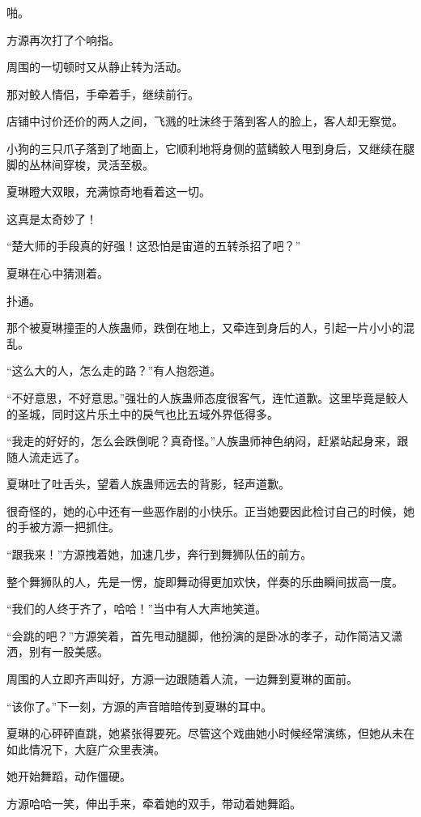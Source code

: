 
\begin{this_body}

啪。

方源再次打了个响指。

周围的一切顿时又从静止转为活动。

那对鲛人情侣，手牵着手，继续前行。

店铺中讨价还价的两人之间，飞溅的吐沫终于落到客人的脸上，客人却无察觉。

小狗的三只爪子落到了地面上，它顺利地将身侧的蓝鳞鲛人甩到身后，又继续在腿脚的丛林间穿梭，灵活至极。

夏琳瞪大双眼，充满惊奇地看着这一切。

这真是太奇妙了！

“楚大师的手段真的好强！这恐怕是宙道的五转杀招了吧？”

夏琳在心中猜测着。

扑通。

那个被夏琳撞歪的人族蛊师，跌倒在地上，又牵连到身后的人，引起一片小小的混乱。

“这么大的人，怎么走的路？”有人抱怨道。

“不好意思，不好意思。”强壮的人族蛊师态度很客气，连忙道歉。这里毕竟是鲛人的圣城，同时这片乐土中的戾气也比五域外界低得多。

“我走的好好的，怎么会跌倒呢？真奇怪。”人族蛊师神色纳闷，赶紧站起身来，跟随人流走远了。

夏琳吐了吐舌头，望着人族蛊师远去的背影，轻声道歉。

很奇怪的，她的心中还有一些恶作剧的小快乐。正当她要因此检讨自己的时候，她的手被方源一把抓住。

“跟我来！”方源拽着她，加速几步，奔行到舞狮队伍的前方。

整个舞狮队的人，先是一愣，旋即舞动得更加欢快，伴奏的乐曲瞬间拔高一度。

“我们的人终于齐了，哈哈！”当中有人大声地笑道。

“会跳的吧？”方源笑着，首先甩动腿脚，他扮演的是卧冰的孝子，动作简洁又潇洒，别有一股美感。

周围的人立即齐声叫好，方源一边跟随着人流，一边舞到夏琳的面前。

“该你了。”下一刻，方源的声音暗暗传到夏琳的耳中。

夏琳的心砰砰直跳，她紧张得要死。尽管这个戏曲她小时候经常演练，但她从未在如此情况下，大庭广众里表演。

她开始舞蹈，动作僵硬。

方源哈哈一笑，伸出手来，牵着她的双手，带动着她舞蹈。


\end{this_body}
